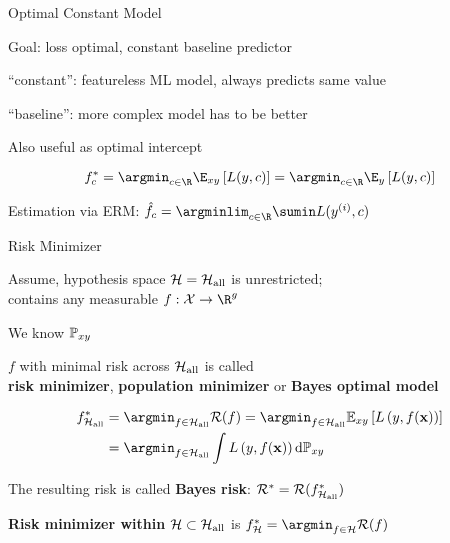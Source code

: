 \documentclass[11pt,compress,t,notes=noshow, xcolor=table]{beamer}
\begin{document}
\begin{framei}[sep=M]{Optimal Constant Model}

\item Goal: loss optimal, constant baseline predictor
\item ``constant'': featureless ML model, always predicts same value
\item ``baseline'': more complex model has to be better 
\item Also useful as optimal intercept


$$f_{c}^{\ast} = \argmin_{c \in \R} \E_{xy} \left[L(y,c)\right] = \argmin_{c \in \R} \E_{y} \left[L(y,c)\right]$$

\item Estimation via ERM: $\hat{f}_c = \argminlim_{c \in \R} \sumin L(\yi,c)$



\end{framei}


\begin{framei}[sep=M]{Risk Minimizer}

\item Assume, hypothesis space $\mathcal{H}=\mathcal{H}_{\text{all}}$ is unrestricted;\\
contains any measurable $f: \Xspace \to \R^g$

\item We know $\mathbb{P}_{xy}$

\item $f$ with minimal risk across $\mathcal{H}_{\text{all}}$
is called\\
\textbf{risk minimizer}, \textbf{population minimizer} or \textbf{Bayes optimal model}

\begin{align*}
\fbayes_{\Hall} &= \argmin_{f \in \Hall} \risk(f) = \argmin_{f \in \Hall}\Exy\left[\Lxy\right]\\ 
&=  \argmin_{f \in \Hall}\int \Lxy \text{d}\Pxy
\end{align*}

\item The resulting risk is called \textbf{Bayes risk}:  $\mathcal{R}^\ast_{} = \mathcal{R}(f^{\ast}_{\mathcal{H}_{\text{all}}})$

\item \textbf{Risk minimizer within} $\mathcal{H} \subset \mathcal{H}_{\text{all}}$ is
$\fbayes_{\Hspace} = \argmin_{f \in \Hspace} \riskf$

\end{framei}
\end{document}
